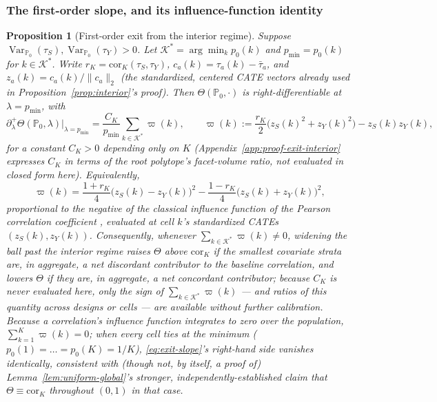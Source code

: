 \documentclass[11pt]{article}
\theoremstyle{plain}
\newtheorem{proposition}[theorem]{Proposition}
\theoremstyle{definition}
\theoremstyle{remark}
\newcommand{\PP}{\mathbb{P}}
\newcommand{\cK}{\mathcal{K}}
\newcommand{\Corr}{\mathrm{cor}}
\DeclareMathOperator{\Var}{Var}
\begin{document}
\subsubsection{The first-order slope, and its influence-function identity}

\begin{proposition}[First-order exit from the interior regime]\label{prop:exit-interior}
Suppose $\Var_{\PP_0}(\tau_S),\Var_{\PP_0}(\tau_Y)>0$. Let $\cK^*=\arg\min_kp_0(k)$
and $p_{\min}=p_0(k)$ for $k\in\cK^*$. Write $r_K=\Corr_K(\tau_S,\tau_Y)$,
$c_a(k)=\tau_a(k)-\bar\tau_a$, and $z_a(k)=c_a(k)/\|c_a\|_2$ (the standardized,
centered CATE vectors already used in Proposition~\ref{prop:interior}'s proof). Then
$\Theta(\PP_0,\cdot)$ is right-differentiable at $\lambda=p_{\min}$, with
\begin{equation}\label{eq:exit-slope}
    \partial_\lambda^+\Theta(\PP_0,\lambda)\Big|_{\lambda=p_{\min}}
    = \frac{C_K}{p_{\min}}\sum_{k\in\cK^*}\varpi(k),
    \qquad
    \varpi(k) := \frac{r_K}2\big(z_S(k)^2+z_Y(k)^2\big) - z_S(k)z_Y(k),
\end{equation}
for a constant $C_K>0$ depending only on $K$
(Appendix~\ref{app:proof-exit-interior} expresses $C_K$ in terms of the root
polytope's facet-volume ratio, not evaluated in closed form here). Equivalently,
\begin{equation}\label{eq:exit-psi-alt}
    \varpi(k) = \frac{1+r_K}4\big(z_S(k)-z_Y(k)\big)^2 - \frac{1-r_K}4\big(z_S(k)+z_Y(k)\big)^2,
\end{equation}
proportional to the negative of the classical influence function of the Pearson
correlation coefficient \citep{DevlinGnanadesikanKettenring1975}, evaluated at cell
$k$'s standardized CATEs $(z_S(k),z_Y(k))$. Consequently, whenever
$\sum_{k\in\cK^*}\varpi(k)\ne0$, widening the ball past the interior regime raises
$\Theta$ above $\Corr_K$ if the smallest covariate strata are, in aggregate, a net
\emph{discordant} contributor to the baseline correlation, and lowers $\Theta$ if
they are, in aggregate, a net \emph{concordant} contributor; because $C_K$ is never
evaluated here, only the \emph{sign} of $\sum_{k\in\cK^*}\varpi(k)$ --- and ratios of
this quantity across designs or cells --- are available without further
calibration. Because a correlation's influence function integrates to zero over the
population, $\sum_{k=1}^K\varpi(k)=0$; when every cell ties at the minimum
($p_0(1)=\dots=p_0(K)=1/K$), \eqref{eq:exit-slope}'s right-hand side vanishes
identically, consistent with (though not, by itself, a proof of)
Lemma~\ref{lem:uniform-global}'s stronger, independently-established claim that
$\Theta\equiv\Corr_K$ throughout $(0,1)$ in that case.
\end{proposition}
\end{document}
